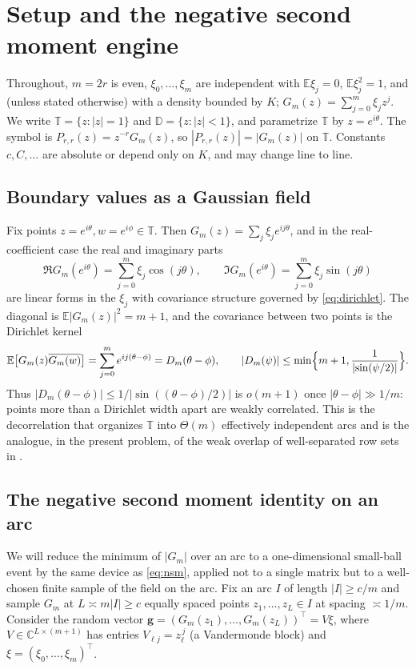 \documentclass[11pt]{amsart}
\numberwithin{equation}{section}
\theoremstyle{definition}
\theoremstyle{remark}
\newcommand{\C}{\mathbb C}
\newcommand{\T}{\mathbb T}
\newcommand{\D}{\mathbb D}
\newcommand{\Exp}{\mathbb E}
\newcommand{\abs}[1]{\left\lvert #1\right\rvert}
\begin{document}
\section{Setup and the negative second moment engine}\label{sec:setup}

Throughout, $m=2r$ is even, $\xi_0,\dots,\xi_m$ are independent with $\Exp\xi_j=0$, $\Exp\xi_j^2=1$, and (unless stated otherwise) with a density bounded by $K$; $G_m(z)=\sum_{j=0}^m\xi_jz^j$. We write $\T=\{z:\abs z=1\}$ and $\D=\{z:\abs z<1\}$, and parametrize $\T$ by $z=e^{i\theta}$. The symbol is $P_{r,r}(z)=z^{-r}G_m(z)$, so $\abs{P_{r,r}(z)}=\abs{G_m(z)}$ on $\T$. Constants $c,C,\dots$ are absolute or depend only on $K$, and may change line to line.

\subsection{Boundary values as a Gaussian field}
Fix points $z=e^{i\theta},w=e^{i\phi}\in\T$. Then $G_m(z)=\sum_j\xi_je^{ij\theta}$, and in the real-coefficient case the real and imaginary parts
\[
  \Re G_m(e^{i\theta})=\sum_{j=0}^m\xi_j\cos(j\theta),\qquad
  \Im G_m(e^{i\theta})=\sum_{j=0}^m\xi_j\sin(j\theta)
\]
are linear forms in the $\xi_j$ with covariance structure governed by \eqref{eq:dirichlet}. The diagonal is $\Exp\abs{G_m(z)}^2=m+1$, and the covariance between two points is the Dirichlet kernel
\begin{equation}\label{eq:cov-again}
  \Exp\bigl[G_m(z)\overline{G_m(w)}\bigr]=\sum_{j=0}^m e^{ij(\theta-\phi)}=D_m(\theta-\phi),
  \qquad
  \abs{D_m(\psi)}\le\min\Bigl\{m+1,\frac{1}{\abs{\sin(\psi/2)}}\Bigr\}.
\end{equation}
Thus $\abs{D_m(\theta-\phi)}\le 1/\abs{\sin((\theta-\phi)/2)}$ is $o(m+1)$ once $\abs{\theta-\phi}\gg1/m$: points more than a Dirichlet width apart are weakly correlated. This is the decorrelation that organizes $\T$ into $\Theta(m)$ effectively independent arcs and is the analogue, in the present problem, of the weak overlap of well-separated row sets in \cite{PhaseRetrieval}.

\subsection{The negative second moment identity on an arc}
We will reduce the minimum of $\abs{G_m}$ over an arc to a one-dimensional small-ball event by the same device as \eqref{eq:nsm}, applied not to a single matrix but to a well-chosen finite sample of the field on the arc. Fix an arc $I$ of length $\abs I\ge c/m$ and sample $G_m$ at $L\asymp m\abs I\ge c$ equally spaced points $z_1,\dots,z_L\in I$ at spacing $\asymp1/m$. Consider the random vector $\mathbf g=(G_m(z_1),\dots,G_m(z_L))^\top=V\xi$, where $V\in\C^{L\times(m+1)}$ has entries $V_{\ell j}=z_\ell^{\,j}$ (a Vandermonde block) and $\xi=(\xi_0,\dots,\xi_m)^\top$.
\end{document}
